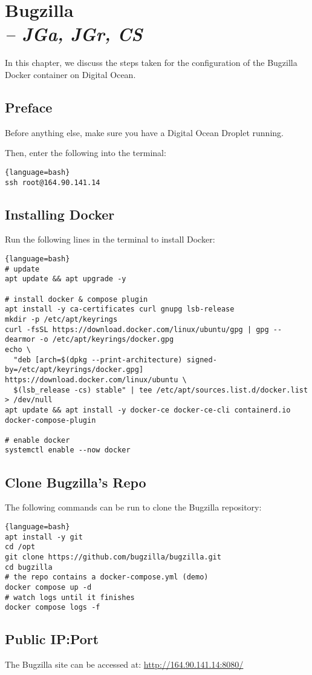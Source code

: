 \chapter[Bugzilla]{Bugzilla \\
\small{\textit{-- JGa, JGr, CS}}
\label{Chapter::Bugzilla}}
In this chapter, we discuss the steps taken for the configuration of the Bugzilla Docker container on Digital Ocean.

\section{Preface}
Before anything else, make sure you have a Digital Ocean Droplet running. 

Then, enter the following into the terminal: 
\begin{lstlisting}{language=bash}
ssh root@164.90.141.14
\end{lstlisting}

\section{Installing Docker}
Run the following lines in the terminal to install Docker:
\begin{lstlisting}{language=bash}
# update
apt update && apt upgrade -y

# install docker & compose plugin
apt install -y ca-certificates curl gnupg lsb-release
mkdir -p /etc/apt/keyrings
curl -fsSL https://download.docker.com/linux/ubuntu/gpg | gpg --dearmor -o /etc/apt/keyrings/docker.gpg
echo \
  "deb [arch=$(dpkg --print-architecture) signed-by=/etc/apt/keyrings/docker.gpg] https://download.docker.com/linux/ubuntu \
  $(lsb_release -cs) stable" | tee /etc/apt/sources.list.d/docker.list > /dev/null
apt update && apt install -y docker-ce docker-ce-cli containerd.io docker-compose-plugin

# enable docker
systemctl enable --now docker
\end{lstlisting}

\section{Clone Bugzilla's Repo}
The following commands can be run to clone the Bugzilla repository:
\begin{lstlisting}{language=bash}
apt install -y git
cd /opt
git clone https://github.com/bugzilla/bugzilla.git
cd bugzilla
# the repo contains a docker-compose.yml (demo)
docker compose up -d
# watch logs until it finishes
docker compose logs -f
\end{lstlisting}

\section{Public IP:Port}
The Bugzilla site can be accessed at: \url{http://164.90.141.14:8080/}


